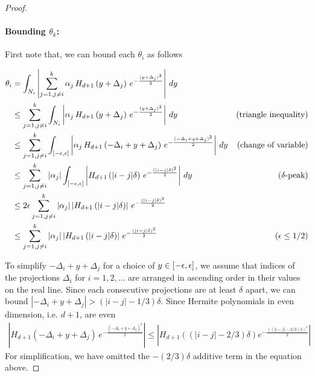 \begin{proof}
    \paragraph{Bounding $\theta_k$:} First note that, we can bound each $\theta_i$ as follows\vspace{-5mm}
    \allowdisplaybreaks
    \begin{center}
    \begin{align*}
        \theta_i &= \int_{N_i} \left| \sum_{j=1, j \neq i}^k \alpha_j \, H_{d+1}\left( y + \Delta_j \right) \, e^{ -\frac{(y + \Delta_j)^2}{2} } \right| \, dy \\ &\le  \sum_{j=1, j \neq i}^k \int_{N_i} \left|  \alpha_j \, H_{d+1}\left( y + \Delta_j \right) \, e^{ -\frac{(y + \Delta_j)^2}{2} } \right| \, dy \quad &\text{(triangle inequality)}\\
        &\le  \sum_{j=1, j \neq i}^k \int_{\left[-\epsilon,\epsilon\right]} \left|  \alpha_j \, H_{d+1}\left(-\Delta_i + y + \Delta_j \right) \, e^{ -\frac{(-\Delta_i + y + \Delta_j)^2}{2} } \right| \, dy &\text{(change of variable)}\\
        & \le \sum_{j=1, j \neq i}^k |\alpha_j| \int_{\left[-\epsilon,\epsilon\right]}  \left| H_{d+1}\left( |i-j|\delta \right) \, e^{ -\frac{(|i-j| \delta)^2}{2} } \right| \, dy \quad &\text{($\delta$-peak)} \\
        & \le 2 \epsilon \sum_{j=1, j \neq i}^k |\alpha_j| \left|H_{d+1}\left( |i-j|\delta \right)\right| \, e^{ -\frac{(|i-j| \delta)^2}{2} } \\
        & \le \sum_{j=1, j \neq i}^k |\alpha_j| \left|H_{d+1}\left( |i-j|\delta \right)\right| \, e^{ -\frac{(|i-j| \delta)^2}{2} } \quad &\text{($\epsilon \le 1/2$)}
    \end{align*}
    \end{center}
    To simplify $-\Delta_i + y + \Delta_j$ for a choice of $y \in \left[-\epsilon,\epsilon\right]$, we assume that indices of the projections $\Delta_i$ for $i = 1,2, \ldots$ are arranged in ascending order in their values on the real line. Since each consecutive projections are at least $\delta$ apart, we can bound $|-\Delta_i + y + \Delta_j| > (|i-j| - 1/3)\delta$. Since Hermite polynomials in even dimension, i.e. $d+1$, are even 
    \begin{align*}
      \left|H_{d+1}\left(-\Delta_i + y + \Delta_j \right) \, e^{ -\frac{(-\Delta_i + y + \Delta_j)^2}{2}}\right| \le \left| H_{d+1}\left((|i - j| - 2/3)\delta\right) e^{ -\frac{((|i - j| - 2/3)\delta)^2}{2}} \right|  
    \end{align*}
    For simplification, we have omitted the $-(2/3)\delta$ additive term in the equation above.


\end{proof}

